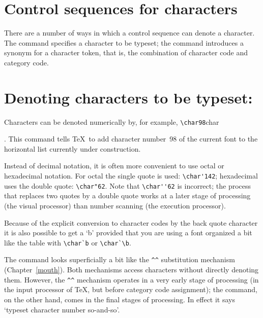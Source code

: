 \section{Control sequences for characters}

There are a number of ways in which a control sequence can denote
a character. The  command specifies a character to be
typeset; the  command introduces
a synonym for a character token, that is,
the combination of character code and category code.

\section{Denoting characters to be typeset: \protect{}}

Characters can be denoted numerically by, for example,
\verb.\char98.\cstoidx char\par.
This command tells \TeX\ to add character number~98 of the
current font to the horizontal list currently under construction.

Instead of decimal notation, it is often more convenient to
use octal or hexadecimal notation. For octal the single quote is used:
\verb.\char'142.; hexadecimal uses the double quote: \verb.\char"62..
Note that \verb.\char''62. is incorrect; the process that replaces
two quotes by a double quote works at a later stage of processing
(the visual processor) than number scanning (the execution processor).

Because of the explicit conversion to character codes by the
back quote character it is also possible to get a `b' \ldash provided
that you are using a font organized a bit like the \ascii{} table \rdash
with \verb.\char`b.  or \verb.\char`\b..

The  command looks superficially a bit like
the \verb-^^- substitution mechanism (Chapter~\ref{mouth}).
Both mechanisms access characters without directly denoting them.
However, the \verb-^^- mechanism operates in a very early stage of
processing (in the input processor of \TeX,
but before category code
assignment); the  command, on the other hand,
comes in the final stages of processing. 
In effect it says `typeset character number
so-and-so'.

